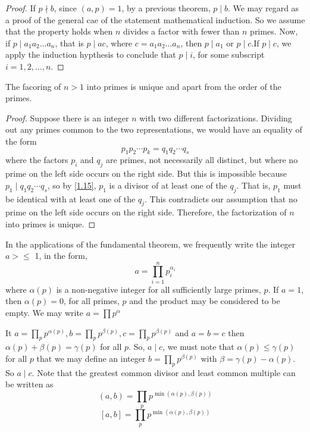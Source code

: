 \documentclass[11pt]{article}
\begin{document}
\begin{proof}
    If \(p \nmid b\), since \((a, p) = 1\), by a previous theorem, \(p \mid b\). We may regard as a proof of the general cae of the statement mathematical induction. So we assume that the property holds when \(n\) divides a factor with fewer than \(n\) primes.
    Now, if \(p \mid a_1a_2\ldots a_n\), that is \(p \mid ac\), where \(c = a_1a_2\ldots a_n\), then \(p \mid a_1\) or \(p \mid c\).If \(p \mid c\), we apply the induction hypthesis to conclude that \(p \mid i\), for some subscript \(i = 1, 2, \ldots, n\).
\end{proof}

\begin{theorem}\label{1.16}
    The facoring of \(n > 1\) into primes is unique and apart from the order of the primes.
\end{theorem}

\begin{proof}
    Suppose there is an integer \(n\) with two different factorizations. Dividing out any primes common to the two representations, we would have an equality of the form
    \[
        p_1 p_2 \cdots p_k = q_1 q_2 \cdots q_s
    \]
    where the factors \(p_i\) and \(q_j\) are primes, not necessarily all distinct,
    but where no prime on the left side occurs on the right side. But this is
    impossible because \(p_1 \mid q_1 q_2 \cdots q_s\), so by \cref{1.15}, \(p_1\)
    is a divisor of at least one of the \(q_j\). That is, \(p_1\) must be identical
    with at least one of the \(q_j\). This contradicts our assumption that no prime
    on the left side occurs on the right side. Therefore, the factorization of
    \(n\) into primes is unique.
\end{proof}

In the applications of the fundamental theorem, we frequently write the integer
\(a > \leqslant\) 1, in the form,
\[
    a = \prod_{i=1}^{n} p_i^{\alpha_i}
\]
where \(\alpha(p)\) is a non-negative integer for all sufficiently large
primes, \(p\). If \(a = 1\), then \(\alpha(p) = 0\), for all primes, \(p\) and
the product may be considered to be empty. We may write \(a = \prod
p^{\alpha}\)

It \(a = \prod_{p} p^{\alpha(p)}, b = \prod_{p} p^{\beta(p)}, c = \prod_{p}
p^{\beta(p)}\) and \(a = b = c\) then \(\alpha(p) + \beta(p) = \gamma(p)\) for
all \(p\). So, \(a \mid c\), we must note that \(\alpha(p) \leqslant
\gamma(p)\) for all \(p\) that we may define an integer \(b =
\prod_{p}p^{\beta(p)}\) with \(\beta = \gamma(p) - \alpha(p)\). So \(a \mid
c\). Note that the greatest common divisor and least common multiple can be
written as \[(a, b) = \prod_{p} p^{\min(\alpha(p), \beta(p))}\] \[[a, b] = \prod_{p} p^{\min(\alpha(p), \beta(p))}\]
\end{document}
